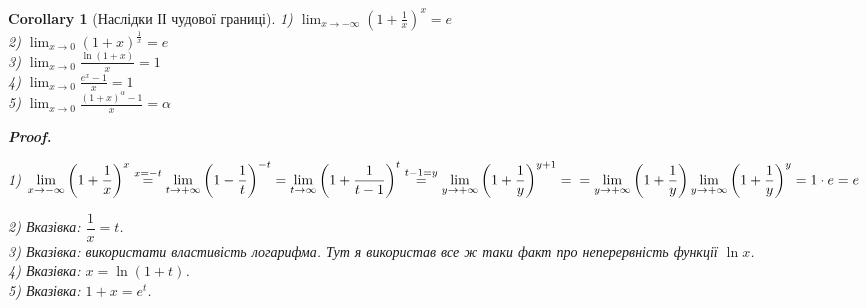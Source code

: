 \documentclass[a4paper, 14pt]{article}
\makeatletter
\def\huge{\displaystyle}
\def\qed{$\blacksquare$}
\theoremstyle{theoremdd}
\theoremstyle{theoremdd}
\theoremstyle{theoremdd}
\theoremstyle{theoremdd}
\theoremstyle{theoremdd}
\theoremstyle{theoremdd}
\theoremstyle{theoremdd}
\theoremstyle{theoremdd}
\newtheorem{corollary}[theorem]{Corollary}
\renewenvironment{proof}[1][Proof.\\]{\par
\pushQED{\hfill \qed}%
\normalfont \topsep6\p@\@plus6\p@\relax
\trivlist
\item\relax
{\bfseries
#1\@addpunct{.}}\hspace\labelsep\ignorespaces
}{%
\popQED\endtrivlist\@endpefalse
}
\makeatother
\begin{document}
\begin{corollary}[Наслідки ІІ чудової границі]
1) $\huge \lim_{x \to -\infty} \left(1 +\frac{1}{x} \right)^x = e$\\
2) $\huge \lim_{x \to 0} \left(1 +x \right)^{\textstyle \frac{1}{x}} = e$\\
3) $\huge \lim_{x \to 0} \frac{\ln(1+x)}{x} = 1$\\
4) $\huge \lim_{x \to 0} \frac{e^x - 1}{x} = 1$\\
5) $\huge \lim_{x \to 0} \frac{(1+x)^\alpha - 1}{x} = \alpha$

\begin{proof}
1) $\huge\lim_{x \to -\infty} \left(1 + \dfrac{1}{x} \right)^x \overset{x =-t}{=} \lim_{t \to +\infty} \left(1 - \dfrac{1}{t} \right)^{-t} = \lim_{t \to \infty} \left(1 + \dfrac{1}{t-1} \right)^t \overset{t-1 = y}{=} \lim_{y \to +\infty} \left(1 + \dfrac{1}{y} \right)^{y+1} = \\ = \lim_{y \to +\infty} \left( 1 + \dfrac{1}{y} \right) \lim_{y \to +\infty} \left( 1 + \dfrac{1}{y} \right)^y = 1 \cdot e = e$
\end{proof}

2) \textit{Вказівка: $\dfrac{1}{x} = t$.}\\
3) \textit{Вказівка: використати властивість логарифма. Тут я використав все ж таки факт про неперервність функції $\ln x$.}\\
4) \textit{Вказівка: $x = \ln(1+t)$.}\\
5) \textit{Вказівка: $1 + x = e^t$.}
\end{corollary}
\end{document}
